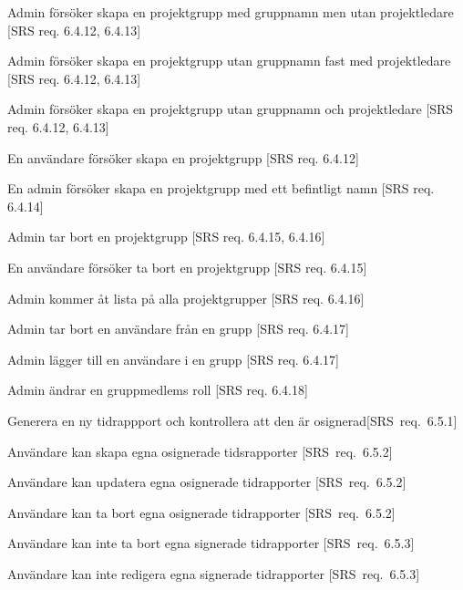 \documentclass[a4paper]{article}
\begin{document}
\begin{appendices}
\begin{FT}
\item 
Admin försöker skapa en projektgrupp med gruppnamn men utan projektledare [SRS req. 6.4.12, 6.4.13]

\item 
Admin försöker skapa en projektgrupp utan gruppnamn fast med projektledare [SRS req. 6.4.12, 6.4.13]

\item 
Admin försöker skapa en projektgrupp utan gruppnamn och projektledare [SRS req. 6.4.12, 6.4.13]

\item
En användare försöker skapa en projektgrupp [SRS req. 6.4.12]

\item 
En admin försöker skapa en projektgrupp med ett befintligt namn [SRS req. 6.4.14]

\item
Admin tar bort en projektgrupp [SRS req. 6.4.15, 6.4.16]

\item
En användare försöker ta bort en projektgrupp [SRS req. 6.4.15]

\item 
Admin kommer åt lista på alla projektgrupper [SRS req. 6.4.16]

\item
Admin tar bort en användare från en grupp [SRS req. 6.4.17]

\item
Admin lägger till en användare i en grupp [SRS req. 6.4.17]

\item
Admin ändrar en gruppmedlems roll [SRS req. 6.4.18]

\item
Generera en ny tidrappport och kontrollera att den är osignerad[SRS~req.~6.5.1]

\item
Användare kan skapa egna osignerade tidsrapporter [SRS~req.~6.5.2]

\item
Användare kan updatera egna osignerade tidrapporter [SRS~req.~6.5.2]

\item
Användare kan ta bort egna osignerade tidrapporter [SRS~req.~6.5.2]

\item
Användare kan inte ta bort egna signerade tidrapporter [SRS~req.~6.5.3]

\item
Användare kan inte redigera egna signerade tidrapporter [SRS~req.~6.5.3]


\end{FT}
\end{appendices}
\end{document}
